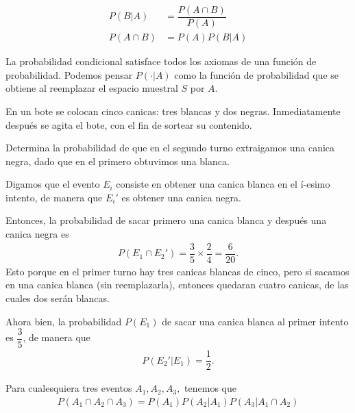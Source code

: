 \begin{definicion}
	\begin{align}
		P(B|A)&=\dfrac{P(A\cap B)}{P(A)} \\
		P(A\cap B) &= P(A)P(B|A)
	\end{align}
\end{definicion}


{}
\begin{observacion}
	La probabilidad condicional satisface todos los axiomas de una función de probabilidad.  Podemos pensar $P(\cdot|A)$ como la función de probabilidad que se obtiene al reemplazar el espacio muestral $S$ por $A.$
\end{observacion}

\begin{ejemplo}
	En un bote se colocan cinco canicas: tres blancas y dos negras. Inmediatamente después se agita el bote, con el fin de sortear su contenido.
	
	Determina la probabilidad de que en el segundo turno extraigamos una canica negra, dado que en el primero obtuvimos una blanca.  
\end{ejemplo}

\begin{solucion}
	Digamos que el evento $ E_i $ consiste en obtener una canica blanca en el í-esimo intento, de manera que $ E_i' $ es obtener una canica negra. 
	
	Entonces, la probabilidad de sacar primero una canica blanca y después una canica negra es 
	\begin{align}
		P(E_1\cap E_2') = \dfrac{3}{5}\times \dfrac{2}{4}=\dfrac{6}{20}.
	\end{align}
	Esto porque en el primer turno hay tres canicas blancas de cinco, pero si sacamos en una canica blanca (sin reemplazarla), entonces quedaran cuatro canicas, de las cuales dos serán blancas. 
	
	Ahora bien, la probabilidad $ P(E_1) $ de sacar una canica blanca al primer intento es $ \dfrac{3}{5} $, de manera que 
	\begin{align}
		P(E_2'|E_1) = \dfrac{1}{2}.
	\end{align}
\end{solucion}





{}
\begin{teorema}
	\label{thm:1.9}
	Para cualesquiera tres eventos $A_{1},A_{2},A_{3},$ tenemos que
	\begin{align}
		\label{1.19}
		P(A_{1} \cap A_{2} \cap A_{3})=P(A_{1})P(A_{2}|A_{1})P(A_{3}|A_{1} \cap A_{2})
	\end{align}
\end{teorema}


